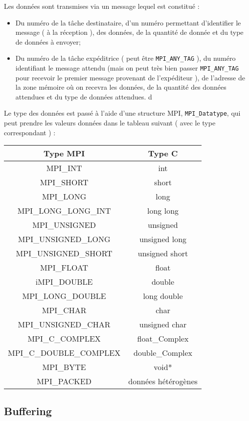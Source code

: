 \documentclass[11pt,a4paper]{article}
\begin{document}
Les données sont transmises via un message lequel est constitué :
\begin{itemize}
\item[\`A l'envoi :] Du numéro de la tâche destinataire, d'un numéro permettant d'identifier
le message ( à la réception ), des données, de la quantité de donnée et du type de données à envoyer;
\item[\`A la réception :] Du numéro de la tâche expéditrice ( peut être \texttt{MPI\_ANY\_TAG} ), 
du numéro identifiant le message attendu
(mais on peut très bien passer \texttt{MPI\_ANY\_TAG} pour recevoir le premier message provenant de
l'expéditeur ), de l'adresse de la zone mémoire où on recevra les données, de la quantité des données
attendues et du type de données attendues.
d\end{itemize}

Le type des données est passé à l'aide d'une structure MPI, \texttt{MPI\_Datatype}, qui peut prendre les valeurs données dans le
tableau suivant ( avec le type correspondant ) :

\begin{tabular}{|c|c|}\hline
Type MPI & Type C \\ \hline
MPI\_INT & int \\
MPI\_SHORT & short \\
MPI\_LONG & long \\
MPI\_LONG\_LONG\_INT & long long \\
MPI\_UNSIGNED & unsigned \\
MPI\_UNSIGNED\_LONG & unsigned long \\
MPI\_UNSIGNED\_SHORT & unsigned short \\
MPI\_FLOAT & float \\
iMPI\_DOUBLE & double \\
MPI\_LONG\_DOUBLE & long double \\
MPI\_CHAR & char \\
MPI\_UNSIGNED\_CHAR & unsigned char \\
MPI\_C\_COMPLEX & float\_Complex \\
MPI\_C\_DOUBLE\_COMPLEX & double\_Complex \\
MPI\_BYTE & void* \\
MPI\_PACKED & données hétérogènes\\ \hline
\end{tabular}

\subsection{Buffering}
\end{document}
